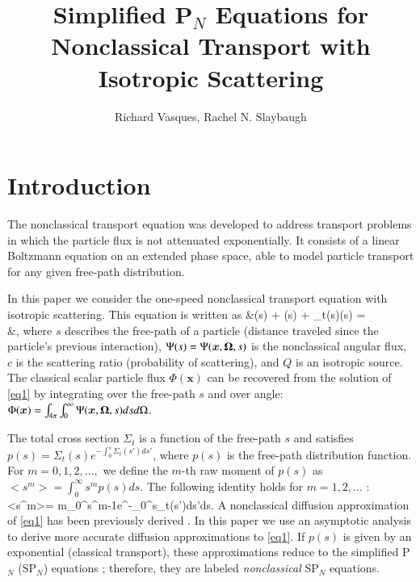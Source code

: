 \documentclass{anstrans}
\title{Simplified P$_N$ Equations for Nonclassical Transport with Isotropic Scattering}
\author{Richard Vasques, Rachel N. Slaybaugh}
\institute{
Department of Nuclear Engineering, University of California, Berkeley, Berkeley, CA 94720-1730}
\def\bal#1\nal{\begin{align}#1\end{align}}
\newcommand{\f}{\frac}
\newcommand{\ux}{{\bm x}}
\newcommand{\unab}{{\bf \nabla}}
\newcommand{\bg}{\big>}
\newcommand{\bl}{\big<}
\newcommand{\uom}{{\bf \Omega}}
\begin{document}
\section{Introduction}

The nonclassical transport equation \cite{larvas11} was developed to address transport problems in which the particle flux is not attenuated exponentially.
It consists of a linear Boltzmann equation on an extended phase space, able to model particle transport for any given free-path distribution.

In this paper we consider the one-speed nonclassical transport equation with isotropic scattering. This equation is written as
\bal\label{eq1}
&\f{\partial \Psi}{\partial s}(s) + \uom\cdot\unab\Psi(s) + \Sigma_t(s)\Psi(s) =\\
&\qquad \f{\delta(s)}{4\pi}\left[\int_{4\pi}\int_0^\infty c\Sigma_t(s')\Psi(\ux,\uom',s')ds'd\Omega' + Q(\ux)\right],\nonumber
\nal
where $s$ describes the free-path of a particle (distance traveled since the particle's previous interaction), $\Psi(s)=\Psi(\ux,\uom,s)$ is the nonclassical angular flux, $c$ is the scattering ratio (probability of scattering), and $Q$ is an isotropic source.
The classical scalar particle flux $\Phi(\ux)$ can be recovered from the solution of \cref{eq1} by integrating over the free-path $s$ and over angle:
$\Phi(\ux) = \int_{4\pi}\int_0^\infty\Psi(\ux,\uom,s)dsd\Omega$.

The total cross section $\Sigma_t$ is a function of the free-path $s$ and satisfies $p(s)= \Sigma_t(s)e^{-\int_0^s\Sigma_t(s')ds'}$, where $p(s)$ is the free-path distribution function.
For $m=0, 1, 2,...,$ we define the $m$-th raw moment of $p(s)$ as
$\bl s^m\bg = \int_0^\infty s^mp(s)ds.$
The following identity holds for $m=1,2,...$ : 
\bal\label{eq2}
\bl s^m\bg = m\int_0^\infty s^{m-1}e^{-\int_0^s\Sigma_t(s')ds'}ds.
\nal
A nonclassical diffusion approximation of \cref{eq1} has been previously derived \cite{larvas11}.
In this paper we use an asymptotic analysis to derive more accurate diffusion approximations to \cref{eq1}.
If $p(s)$ is given by an exponential (classical transport), these approximations reduce to the simplified P$_N$ (SP$_N$) equations \cite{mcl11}; therefore, they are labeled \textit{nonclassical} SP$_N$ equations.

\end{document}
